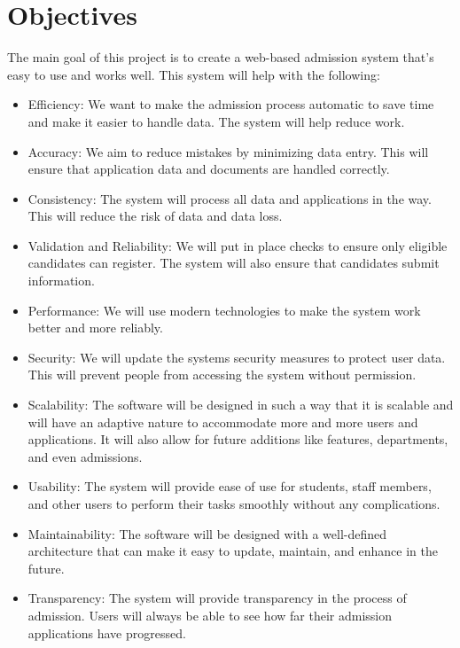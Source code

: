 \clearpage
\section{Objectives}

The main goal of this project is to create a web-based admission system that's easy to use and works well. This system will help with the following:

\begin{itemize}

    \item {Efficiency:} We want to make the admission process automatic to save time and make it easier to handle data. The system will help reduce work.

    \item {Accuracy:} We aim to reduce mistakes by minimizing data entry. This will ensure that application data and documents are handled correctly.

    \item {Consistency:} The system will process all data and applications in the way. This will reduce the risk of data and data loss.

    \item {Validation and Reliability:} We will put in place checks to ensure only eligible candidates can register. The system will also ensure that candidates submit information.

    \item {Performance:} We will use modern technologies to make the system work better and more reliably.

    \item {Security:} We will update the systems security measures to protect user data. This will prevent people from accessing the system without permission.

    \item {Scalability:} The software will be designed in such a way that it is scalable and will have an adaptive nature to accommodate more and more users and applications. It will also allow for future additions like features, departments, and even admissions.

\item {Usability:} The system will provide ease of use for students, staff members, and other users to perform their tasks smoothly without any complications.

\item {Maintainability:} The software will be designed with a well-defined architecture that can make it easy to update, maintain, and enhance in the future.

\item {Transparency:} The system will provide transparency in the process of admission. Users will always be able to see how far their admission applications have progressed.

\end{itemize}

\clearpage

